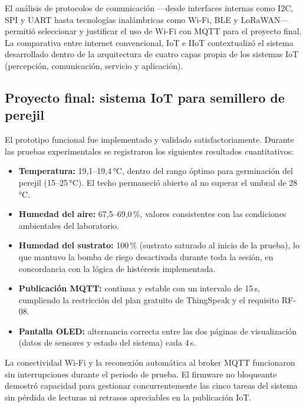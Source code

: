 El análisis de protocolos de comunicación —desde interfaces internas como I2C, SPI y UART hasta tecnologías inalámbricas como Wi-Fi, BLE y LoRaWAN— permitió seleccionar y justificar el uso de Wi-Fi con MQTT para el proyecto final. La comparativa entre internet convencional, IoT e IIoT contextualizó el sistema desarrollado dentro de la arquitectura de cuatro capas propia de los sistemas IoT (percepción, comunicación, servicio y aplicación).

\subsection{Proyecto final: sistema IoT para semillero de perejil}

El prototipo funcional fue implementado y validado satisfactoriamente. Durante las pruebas experimentales se registraron los siguientes resultados cuantitativos:

\begin{itemize}
    \item \textbf{Temperatura:} 19,1--19,4\,°C, dentro del rango óptimo para germinación del perejil (15--25\,°C). El techo permaneció abierto al no superar el umbral de 28\,°C.
    \item \textbf{Humedad del aire:} 67,5--69,0\,\%, valores consistentes con las condiciones ambientales del laboratorio.
    \item \textbf{Humedad del sustrato:} 100\,\% (sustrato saturado al inicio de la prueba), lo que mantuvo la bomba de riego desactivada durante toda la sesión, en concordancia con la lógica de histéresis implementada.
    \item \textbf{Publicación MQTT:} continua y estable con un intervalo de 15\,s, cumpliendo la restricción del plan gratuito de ThingSpeak y el requisito RF-08.
    \item \textbf{Pantalla OLED:} alternancia correcta entre las dos páginas de visualización (datos de sensores y estado del sistema) cada 4\,s.
\end{itemize}

La conectividad Wi-Fi y la reconexión automática al broker MQTT funcionaron sin interrupciones durante el periodo de prueba. El firmware no bloqueante demostró capacidad para gestionar concurrentemente las cinco tareas del sistema sin pérdida de lecturas ni retrasos apreciables en la publicación IoT.
